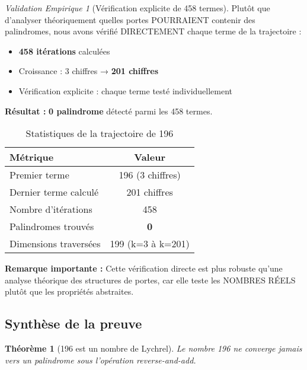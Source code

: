 \documentclass[12pt,a4paper]{article}
\newtheorem{theorem}{Théorème}[section]
\theoremstyle{remark}
\newtheorem{validation}{Validation Empirique}[section]
\begin{document}
\begin{validation}[Vérification explicite de 458 termes]
Plutôt que d'analyser théoriquement quelles portes POURRAIENT contenir des palindromes, nous avons vérifié DIRECTEMENT chaque terme de la trajectoire :

\begin{itemize}
\item \textbf{458 itérations} calculées
\item Croissance : 3 chiffres → \textbf{201 chiffres}
\item Vérification explicite : chaque terme testé individuellement
\end{itemize}

\textbf{Résultat :} \textbf{0 palindrome} détecté parmi les 458 termes.

\begin{table}[h]
\centering
\caption{Statistiques de la trajectoire de 196}
\label{tab:trajectoire_196}
\begin{tabular}{lc}
\toprule
\textbf{Métrique} & \textbf{Valeur}\\
\midrule
Premier terme & 196 (3 chiffres)\\
Dernier terme calculé & 201 chiffres\\
Nombre d'itérations & 458\\
Palindromes trouvés & \textbf{0}\\
Dimensions traversées & 199 (k=3 à k=201)\\
\bottomrule
\end{tabular}
\end{table}

\textbf{Remarque importante :} Cette vérification directe est plus robuste qu'une analyse théorique des structures de portes, car elle teste les NOMBRES RÉELS plutôt que les propriétés abstraites.
\end{validation}

\subsection{Synthèse de la preuve}

\begin{theorem}[196 est un nombre de Lychrel]
Le nombre 196 ne converge jamais vers un palindrome sous l'opération \textit{reverse-and-add}.
\end{theorem}
\end{document}
